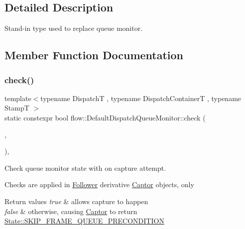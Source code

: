 \subsection{Detailed Description}
Stand-\/in type used to replace queue monitor. 

\subsection{Member Function Documentation}
\mbox{\label{structflow_1_1_default_dispatch_queue_monitor_aed3f0234eeb6d3c60043d9d36047301a}} 
\subsubsection{\texorpdfstring{check()}{check()}}
{\footnotesize\ttfamily template$<$typename DispatchT , typename Dispatch\+ContainerT , typename StampT $>$ \\
static constexpr bool flow\+::\+Default\+Dispatch\+Queue\+Monitor\+::check (\begin{DoxyParamCaption}\item[{\hyperlink{classflow_1_1_dispatch_queue}{Dispatch\+Queue}$<$ DispatchT, Dispatch\+ContainerT $>$ \&}]{,  }\item[{const \hyperlink{structflow_1_1_capture_range}{Capture\+Range}$<$ StampT $>$ \&}]{ }\end{DoxyParamCaption})\hspace{0.3cm}{\ttfamily [inline]}, {\ttfamily [static]}}



Check queue monitor state with on capture attempt. 

Checks are applied in \hyperlink{classflow_1_1_follower}{Follower} derivative \hyperlink{classflow_1_1_captor}{Captor} objects, only


\begin{DoxyRetVals}{Return values}
{\em true} & allows capture to happen \\
\hline
{\em false} & otherwise, causing \hyperlink{classflow_1_1_captor}{Captor} to return {\ttfamily \hyperlink{namespaceflow_adefe9726e597eb50c46f0f6a202018e9a553bb3189571a5b09c1d53c315abd8f8}{State\+::\+S\+K\+I\+P\+\_\+\+F\+R\+A\+M\+E\+\_\+\+Q\+U\+E\+U\+E\+\_\+\+P\+R\+E\+C\+O\+N\+D\+I\+T\+I\+ON}} \\
\hline
\end{DoxyRetVals}
\mbox{\label{structflow_1_1_default_dispatch_queue_monitor_acccd20e4a17462c3d8d14e0aa26d1982}} 
